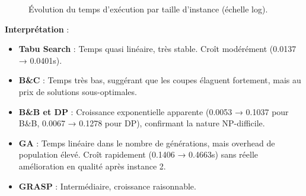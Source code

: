 \documentclass[11pt,a4paper]{article}
\begin{document}
\begin{figure}[H]
\centering
{}
\caption{Évolution du temps d'exécution par taille d'instance (échelle log).}
\label{fig:time-by-size}
\end{figure}

\textbf{Interprétation} :

\begin{itemize}
    \item \textbf{Tabu Search} : Temps quasi linéaire, très stable. Croît modérément (0.0137 → 0.0401s).
    
    \item \textbf{B\&C} : Temps très bas, suggérant que les coupes élaguent fortement, mais au prix de solutions sous-optimales.
    
    \item \textbf{B\&B et DP} : Croissance exponentielle apparente (0.0053 → 0.1037 pour B\&B, 0.0067 → 0.1278 pour DP), confirmant la nature NP-difficile.
    
    \item \textbf{GA} : Temps linéaire dans le nombre de générations, mais overhead de population élevé. Croît rapidement (0.1406 → 0.4663s) sans réelle amélioration en qualité après instance 2.
    
    \item \textbf{GRASP} : Intermédiaire, croissance raisonnable.
\end{itemize}
\end{document}
